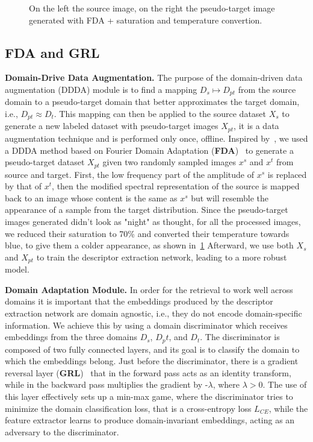 \documentclass[10pt,twocolumn,letterpaper]{article}
\begin{document}
\begin{figure}[b]
    \centering
    \caption{On the left the source image, on the right the pseudo-target image generated with FDA + saturation and temperature convertion.}
    \label{fig:fda_show}
\end{figure}

\subsection{FDA and GRL}
\textbf{Domain-Drive Data Augmentation.}
The purpose of the domain-driven data augmentation (DDDA) module is to find a mapping $D_s \mapsto D_{pt}$ from the source domain to a pseudo-target domain that better approximates the target domain, i.e., $D_{pt} \approx D_t$. This mapping can then be applied to the source dataset $X_s$ to generate a new labeled dataset with pseudo-target images $X_{pt}$, it is a data augmentation technique and is performed only once, offline. Inspired by~\cite{fda, adageo}, we used a DDDA method based on Fourier Domain Adaptation (\textbf{FDA})~\cite{fda} to generate a pseudo-target dataset $X_{pt}$ given two randomly sampled images $x^s$ and $x^t$ from source and target. First, the low frequency part of the amplitude of $x^s$ is replaced by that of $x^t$, then the modified spectral representation of the source is mapped back to an image whose content is the same as $x^s$ but will resemble the appearance of a sample from the target distribution.
Since the pseudo-target images generated didn't look as "night" as thought, for all the processed images, we reduced their saturation to 70\% and converted their temperature towards blue, to give them a colder appearance, as shown in~\cref{fig:fda_show}
Afterward, we use both $X_s$ and $X_{pt}$ to train the descriptor extraction network, leading to a more robust model.
\newline

\textbf{Domain Adaptation Module.}
In order for the retrieval to work well across domains it is important that the embeddings produced by the descriptor extraction network are domain agnostic, i.e., they do not encode domain-specific information. We achieve this by using a domain discriminator which receives embeddings from the three domains $D_s$, $D_pt$, and $D_t$. The discriminator is composed of two fully connected layers, and its goal is to classify the domain to which the embeddings belong. Just before the discriminator, there is a gradient reversal layer (\textbf{GRL})~\cite{grl} that in the forward pass acts as an identity transform, while in the backward pass multiplies the gradient by -$\lambda$, where $\lambda > 0$. The use of this layer effectively sets up a min-max game, where the discriminator tries to minimize the domain classification loss, that is a cross-entropy loss $L_{CE}$, while the feature extractor learns to produce domain-invariant embeddings, acting as an adversary to the discriminator.
\newline
\end{document}
